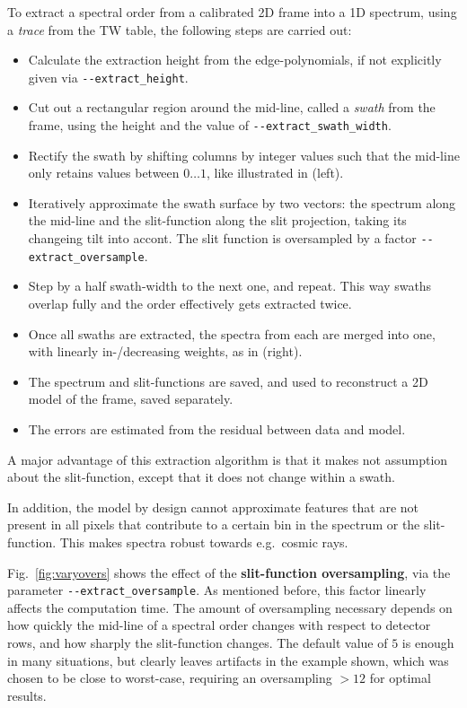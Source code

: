 To extract a spectral order from a calibrated 2D frame into a 1D spectrum, using
a \emph{trace} from the TW table, the following steps are carried out:
\begin{itemize}
    \item Calculate the extraction height from the edge-polynomials, if not
    explicitly given via \texttt{-{}-extract\_height}.
    \item Cut out a rectangular region around the mid-line, called a
    \emph{swath} from the frame, using the height and the value of
    \texttt{-{}-extract\_swath\_width}.
    \item Rectify the swath by shifting columns by integer values such that the
    mid-line only retains values between $0\ldots 1$, like illustrated in
     (left).
    \item Iteratively approximate the swath surface by two vectors: the spectrum
    along the mid-line and the slit-function along the slit projection, taking
    its changeing tilt into accont. The slit function is oversampled by a factor
    \verb!--extract_oversample!.
    \item Step by a half swath-width to the next one, and repeat. This way
    swaths overlap fully and the order effectively gets extracted twice.
    \item Once all swaths are extracted, the spectra from each are merged into
    one, with linearly in-/decreasing weights, as in 
    (right).
    \item The spectrum and slit-functions are saved, and used to reconstruct a
    2D model of the frame, saved separately.
    \item The errors are estimated from the residual between data and model.
\end{itemize}

A major advantage of this extraction algorithm is that it makes not assumption
about the slit-function, except that it does not change within a swath.

In addition, the model by design cannot approximate features that are not
present in all pixels that contribute to a certain bin in the spectrum or the
slit-function. This makes spectra robust towards e.g.~cosmic rays.

Fig.~\ref{fig:varyovers} shows the effect of the \textbf{slit-function
oversampling}, via  the parameter \verb!--extract_oversample!. As mentioned
before, this factor linearly affects the computation time. The amount of
oversampling necessary depends on how quickly the mid-line of a spectral order
changes with respect to detector rows, and how sharply the slit-function
changes. The default value of $5$ is enough in many situations, but clearly
leaves artifacts in the example shown, which was chosen to be close to
worst-case, requiring an oversampling $>12$ for optimal results.

